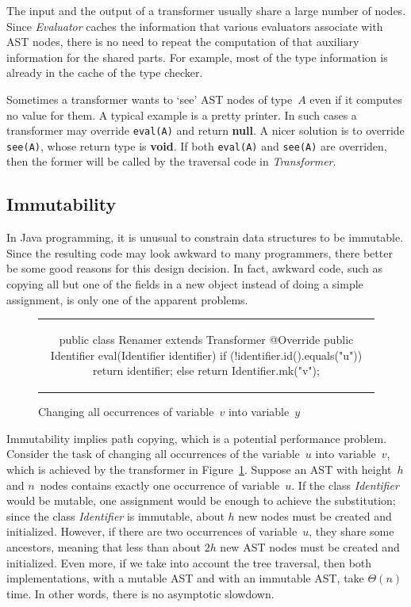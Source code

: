 \documentclass{llncs}
\newcommand{\jmlCode}{\lstinline[style=jml,basicstyle=\normalsize]}
\newcommand{\bc}{\begin{figure}\centering\begin{tabular}{c}} %
\newcommand{\ec}[2]{\end{tabular}\caption{#1}\label{#2}\end{figure}} %
\begin{document}
The input and the output of a transformer usually share a large
number of nodes. Since \textit{Evaluator} caches the information
that various evaluators associate with AST nodes, there is no
need to repeat the computation of that auxiliary information for
the shared parts. For example, most of the type information is
already in the cache of the type checker.

Sometimes a transformer wants to `see' AST nodes of type~$A$
even if it computes no value for them. A typical example is
a pretty printer. In such cases a transformer may override
\jmlCode|eval(A)| and return \textbf{null}. A nicer solution is
to override \jmlCode|see(A)|, whose return type is \textbf{void}.
If both \jmlCode|eval(A)| and \jmlCode|see(A)| are overriden,
then the former will be called by the traversal code in
\textit{Transformer}.


\subsection{Immutability}
\label{sec:design.immutability}

In Java programming, it is unusual to constrain data structures
to be immutable. Since the resulting code may look awkward to
many programmers, there better be some good reasons for this
design decision. In fact, awkward code, such as copying all but
one of the fields in a new object instead of doing a simple
assignment, is only one of the apparent problems.

\bc
\begin{jml}
public class Renamer extends Transformer {
  @Override public Identifier eval(Identifier identifier) {
    if (!identifier.id().equals("u")) return identifier;
    else return Identifier.mk("v");
  }
}
\end{jml}
\ec{Changing all occurrences of variable~$v$ into variable~$y$}
{lst:example-transformer}

Immutability implies path copying, which is a
potential performance problem. Consider the task of
changing all occurrences of the variable~$u$ into
variable~$v$, which is achieved by the transformer in
Figure~\ref{lst:example-transformer}. Suppose an AST with
height~$h$ and $n$~nodes contains exactly one occurrence of
variable~$u$. If the class \textit{Identifier} would be mutable,
one assignment would be enough to achieve the substitution;
since the class \textit{Identifier} is immutable, about $h$ new
nodes must be created and initialized. However, if there are
two occurrences of variable~$u$, they share some ancestors,
meaning that less than about $2h$ new AST nodes must be created
and initialized. Even more, if we take into account the tree
traversal, then both implementations, with a mutable AST and with
an immutable AST, take $\Theta(n)$ time. In other words, there is
no asymptotic slowdown.
\end{document}
